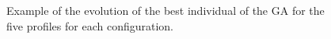 \documentclass[letterpaper]{article}
\begin{document}
\begin{figure}[htb]
\centering

\caption{Example of the evolution of the best individual of the GA for the five
  profiles for each configuration.}

\label{fig:boxplots}
\end{figure}
\end{document}

